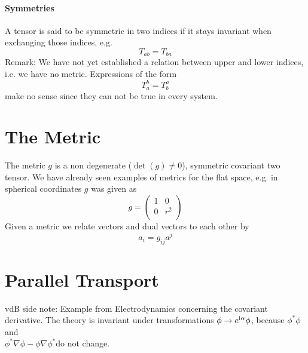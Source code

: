 \paragraph{Symmetries}
A tensor is said to be symmetric in two indices if it stays invariant when exchanging those indices, e.g.
\begin{equation}
    T_{ab}=T_{ba}
\end{equation}
Remark: We have not yet established a relation between upper and lower indices, i.e. we have no metric. Expressions of the form
\begin{equation}
    T_a^b=T_b^a
\end{equation}
make no sense since they can not be true in every system.
\section{The Metric}
The metric $g$ is a non degenerate ($\det(g)\neq 0$), symmetric covariant two tensor. 
We have already seen examples of metrics for the flat space, e.g. in spherical coordinates $g$ was given as
\begin{equation}
    g=
    \begin{pmatrix}
        1 & 0\\
        0 & r^2\\
    \end{pmatrix}
\end{equation}
Given a metric we relate vectors and dual vectors to each other by
\begin{equation}
    a_i=g_{ij}a^j
\end{equation}
\section{Parallel Transport}
vdB side note: Example from Electrodynamics concerning the covariant derivative. 
The theory is invariant under transformations $\phi\to e^{\mathrm{i} \alpha}\phi$, 
because $\phi^*\phi$ and\\ $\phi^*\nabla\phi-\phi\nabla\phi^*$do not change.
